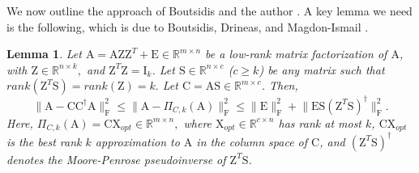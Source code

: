 \documentclass[11pt]{article}
\newcommand{\FNormS}[1]{\mbox{}\|#1\|_\mathrm{F}^2}
\newtheorem{lemma}[theorem]{Lemma}
\newcommand{\mat}[1]{{\ensuremath{\bm{\mathrm{#1}}}}}
\def\matA{\mat{A}}
\def\matC{\mat{C}}
\def\matE{\mat{E}}
\def\matI{\mat{I}}
\def\matS{\mat{S}}
\def\matX{\mat{X}}
\def\matZ{\mat{Z}}
\begin{document}
We now outline the approach of Boutsidis and the author \cite{BW14}. A key lemma we need is the following, which
is due to Boutsidis, Drineas, and Magdon-Ismail \cite{BDM11a}. 
\begin{lemma}
\label{lem:structural}
Let $\matA = \matA \matZ \matZ^T + \matE \in \mathbb{R}^{m \times n}$ 
be a low-rank matrix factorization of $\matA$, with $\matZ \in \mathbb{R}^{n \times k},$
and $\matZ^T \matZ= \matI_{k}$.
Let $\matS\in\mathbb{R}^{n\times c}$ ($c \ge k$) be any matrix such that $rank(\matZ^T \matS) =
rank(\matZ)=k.$
Let $\matC = \matA \matS \in \mathbb{R}^{m \times c}$. Then,
$$
\FNormS{\matA - \matC \matC^{\dagger} \matA} \le
  \FNormS{\matA - \Pi_{C,k}(\matA)} \le
\FNormS{\matE} +\FNormS{\matE \matS (\matZ^T\matS)^{\dagger}}.
$$
Here, $\Pi_{C,k}(\matA) = \matC \matX_{opt} \in \mathbb{R}^{m \times n},$ 
where $\matX_{opt}\in \mathbb{R}^{c \times n}$ has rank at most $k$, 
$\matC \matX_{opt}$ is the
best rank $k$ approximation to $\matA$ in the column space of $\matC$, and $(\matZ^T \matS)^{\dagger}$ denotes the Moore-Penrose 
pseudoinverse of $\matZ^T \matS$.
\end{lemma}
\end{document}
